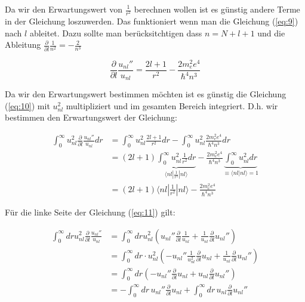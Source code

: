 Da wir den Erwartungswert von \(\frac{1}{r^2}\) berechnen wollen ist es günstig andere Terme in der Gleichung loszuwerden. Das funktioniert wenn man die Gleichung (\ref{eq:9}) nach \(l\) ableitet. Dazu sollte man berücksitchtigen dass \(n=N+l+1\) und die Ableitung \(\frac{\partial}{\partial l}\frac{1}{n^2} = -\frac{2}{n^3} \)

\begin{equation}
  \label{eq:10}
  \frac{\partial}{\partial l}\frac{u_{nl}''}{u_{nl}} = \frac{2l+1}{r^2} - \frac{2 m_e^2e^4}{\hbar^4 n^3}
\end{equation}


Da wir den Erwartungswert bestimmen möchten ist es günstig die Gleichung (\ref{eq:10}) mit \(u_{nl}^2\) multipliziert und im gesamten Bereich integriert. D.h. wir bestimmen den Erwartungswert der Gleichung:

\begin{align}
  \label{eq:11}
  \int_0^{\infty} u_{nl}^2 \frac{\partial}{\partial l}\frac{u_{nl}''}{u_{nl}} dr &= \int_0^{\infty} u_{nl}^2 \frac{2l+1}{r^2} dr - \int_0^{\infty} u_{nl}^2\frac{2 m_e^2e^4}{\hbar^4 n^3}dr\\
&=(2l+1) \underbrace{ \int_0^{\infty} u_{nl}^2 \frac{1}{r^2}dr}_{\langle nl|\frac{1}{r^2}|nl\rangle  } -\frac{2 m_e^2e^4}{\hbar^4 n^3}\underbrace{ \int_0^{\infty} u_{nl}^2 dr}_{\equiv\langle nl|nl\rangle = 1 } \\
&=(2l+1)\langle nl|\frac{1}{r^2}|nl\rangle   -\frac{2 m_e^2e^4}{\hbar^4 n^3}
\end{align}

Für die linke Seite der Gleichung (\ref{eq:11}) gilt:

\begin{align}
  \label{eq:12}
   \int_0^{\infty}dr u_{nl}^2 \frac{\partial}{\partial l}\frac{u_{nl}''}{u_{nl}} &= \int_0^{\infty}dr u_{nl}^2\left(u_{nl}'' \frac{\partial}{\partial l}\frac{1}{u_{nl}}+ \frac{1}{u_{nl}} \frac{\partial}{\partial l}u_{nl}''  \right) \\
&= \int_0^{\infty}dr\cdot u_{nl}^2\left(- u_{nl}'' \frac{1}{u_{nl}^2}\frac{\partial}{\partial l} u_{nl}  + \frac{1}{u_{nl}} \frac{\partial}{\partial l}u_{nl}''  \right)\\
&= \int_0^{\infty}dr \left(- u_{nl}'' \frac{\partial}{\partial l} u_{nl}  + u_{nl} \frac{\partial}{\partial l}u_{nl}''  \right)\\
&= - \int_0^{\infty}dr\, u_{nl}'' \frac{\partial}{\partial l} u_{nl}  +\int_0^{\infty}dr\,  u_{nl} \frac{\partial}{\partial l}u_{nl}''
\end{align}

